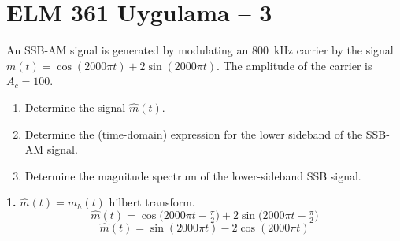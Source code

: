 \documentclass[11pt,a4paper]{article}
\begin{document}

\section{ELM 361 Uygulama -- 3}

\begin{ornek}[3.16 (SSB)]
An SSB-AM signal is generated by modulating an \qty{800}{\kilo\hertz} carrier by the signal $m(t)=\cos(2000\pi t)+2\sin(2000\pi t)$. The amplitude of the carrier is $A_c=100$.
\begin{enumerate}
\item Determine the signal $\hat m(t)$.
\item Determine the (time-domain) expression for the lower sideband of the SSB-AM signal.
\item Determine the magnitude spectrum of the lower-sideband SSB signal.
\end{enumerate}
\end{ornek}

\noindent\textbf{1.} $\hat m(t)=m_h(t)$ \quad hilbert transform.
\[ \hat m(t)=\cos\Big(2000\pi t-\tfrac{\pi}{2}\Big)+2\sin\Big(2000\pi t-\tfrac{\pi}{2}\Big) \]
\[ \hat m(t)=\sin(2000\pi t)-2\cos(2000\pi t) \]
\end{document}
